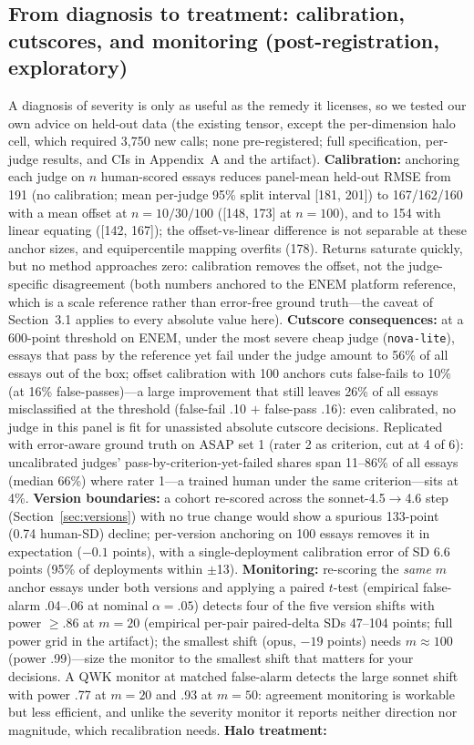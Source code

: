 \documentclass[fleqn,10pt]{JLA_article}
\begin{document}
\subsection{From diagnosis to treatment: calibration, cutscores, and monitoring (post-registration, exploratory)}
\label{sec:treat}

A diagnosis of severity is only as useful as the remedy it licenses, so we tested our own advice on held-out data (the existing tensor, except the per-dimension halo cell, which required 3,750 new calls; none pre-registered; full specification, per-judge results, and CIs in Appendix~A and the artifact). \textbf{Calibration:} anchoring each judge on $n$ human-scored essays reduces panel-mean held-out RMSE from 191 (no calibration; mean per-judge 95\% split interval [181, 201]) to 167/162/160 with a mean offset at $n{=}10/30/100$ ([148, 173] at $n{=}100$), and to 154 with linear equating ([142, 167]); the offset-vs-linear difference is not separable at these anchor sizes, and equipercentile mapping overfits (178). Returns saturate quickly, but no method approaches zero: calibration removes the offset, not the judge-specific disagreement (both numbers anchored to the ENEM platform reference, which is a scale reference rather than error-free ground truth---the caveat of Section~3.1 applies to every absolute value here). \textbf{Cutscore consequences:} at a 600-point threshold on ENEM, under the most severe cheap judge (\texttt{nova-lite}), essays that pass by the reference yet fail under the judge amount to 56\% of all essays out of the box; offset calibration with 100 anchors cuts false-fails to 10\% (at 16\% false-passes)---a large improvement that still leaves 26\% of all essays misclassified at the threshold (false-fail .10 $+$ false-pass .16): even calibrated, no judge in this panel is fit for unassisted absolute cutscore decisions. Replicated with error-aware ground truth on ASAP set 1 (rater 2 as criterion, cut at 4 of 6): uncalibrated judges' pass-by-criterion-yet-failed shares span 11--86\% of all essays (median 66\%) where rater 1---a trained human under the same criterion---sits at 4\%. \textbf{Version boundaries:} a cohort re-scored across the sonnet-4.5$\to$4.6 step (Section~\ref{sec:versions}) with no true change would show a spurious 133-point (0.74 human-SD) decline; per-version anchoring on 100 essays removes it in expectation ($-0.1$ points), with a single-deployment calibration error of SD 6.6 points (95\% of deployments within $\pm$13). \textbf{Monitoring:} re-scoring the \emph{same} $m$ anchor essays under both versions and applying a paired $t$-test (empirical false-alarm .04--.06 at nominal $\alpha{=}.05$) detects four of the five version shifts with power $\geq.86$ at $m{=}20$ (empirical per-pair paired-delta SDs 47--104 points; full power grid in the artifact); the smallest shift (opus, $-19$ points) needs $m{\approx}100$ (power .99)---size the monitor to the smallest shift that matters for your decisions. A QWK monitor at matched false-alarm detects the large sonnet shift with power .77 at $m{=}20$ and .93 at $m{=}50$: agreement monitoring is workable but less efficient, and unlike the severity monitor it reports neither direction nor magnitude, which recalibration needs. \textbf{Halo treatment:} 
\end{document}
